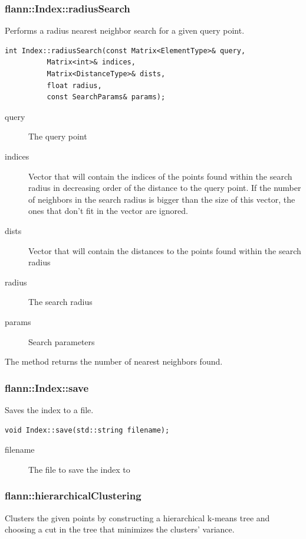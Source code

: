 \documentclass[letter,10pt]{article}
\begin{document}
\subsubsection{flann::Index::radiusSearch}
Performs a radius nearest neighbor search for a given query point.
\begin{Verbatim}[fontsize=\footnotesize,frame=single]
int Index::radiusSearch(const Matrix<ElementType>& query,
		  Matrix<int>& indices,
		  Matrix<DistanceType>& dists,
		  float radius,
		  const SearchParams& params); 
\end{Verbatim}

\begin{description}
\item[query]{The query point}
\item[indices]{Vector that will contain the indices of the points found within the search radius in decreasing order of the distance to the query point. If the number of neighbors in the search radius is bigger than the size of this vector, the ones that don't fit in the vector are ignored. }
\item[dists]{Vector that will contain the distances to the points found within the search radius}
\item[radius]{The search radius}
\item[params]{Search parameters}
\end{description}
The method returns the number of nearest neighbors found.


\subsubsection{flann::Index::save}
Saves the index to a file.
\begin{Verbatim}[fontsize=\footnotesize,frame=single]
  void Index::save(std::string filename);
\end{Verbatim}
\begin{description}
\item[filename]{The file to save the index to}
\end{description}

\subsubsection{flann::hierarchicalClustering}
\label{flann::hierarchicalClustering}
Clusters the given points by constructing a hierarchical k-means tree and choosing a cut in the tree that minimizes the clusters' variance.
\end{document}
